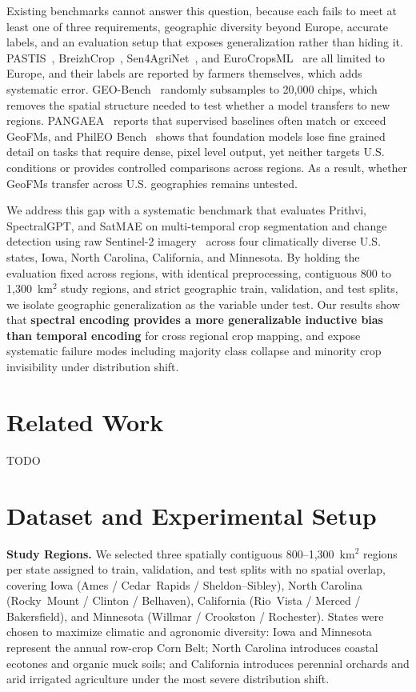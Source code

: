 \documentclass[sigconf]{acmart}
\begin{document}
Existing benchmarks cannot answer this question, because each fails to meet at least one of three requirements, geographic diversity beyond Europe, accurate labels, and an evaluation setup that exposes generalization rather than hiding it. PASTIS~\cite{garnot2021panoptic}, BreizhCrop~\cite{russwurm2019breizhcrops}, Sen4AgriNet~\cite{sykas2021sen4agrinet}, and EuroCropsML~\cite{reuss2025eurocropsml} are all limited to Europe, and their labels are reported by farmers themselves, which adds systematic error. GEO-Bench~\cite{lacoste2023geobench} randomly subsamples to 20{,}000 chips, which removes the spatial structure needed to test whether a model transfers to new regions. PANGAEA~\cite{marsocci2024pangaea} reports that supervised baselines often match or exceed GeoFMs, and PhilEO Bench~\cite{fibaek2024phileo} shows that foundation models lose fine grained detail on tasks that require dense, pixel level output, yet neither targets U.S. conditions or provides controlled comparisons across regions. As a result, whether GeoFMs transfer across U.S. geographies remains untested.

We address this gap with a systematic benchmark that evaluates Prithvi, SpectralGPT, and SatMAE on multi-temporal crop segmentation and change detection using raw Sentinel-2 imagery~\cite{sentinel2_eoportal} across four climatically diverse U.S. states, Iowa, North Carolina, California, and Minnesota. By holding the evaluation fixed across regions, with identical preprocessing, contiguous 800 to 1{,}300~km$^{2}$ study regions, and strict geographic train, validation, and test splits, we isolate geographic generalization as the variable under test. Our results show that \textbf{spectral encoding provides a more generalizable inductive bias than temporal encoding} for cross regional crop mapping, and expose systematic failure modes including majority class collapse and minority crop invisibility under distribution shift.


\section{Related Work}

TODO


\section{Dataset and Experimental Setup}
\textbf{Study Regions.}
We selected three spatially contiguous 800--1{,}300~km$^{2}$
regions per state assigned to train, validation, and test
splits with no spatial overlap, covering Iowa (Ames /
Cedar~Rapids / Sheldon--Sibley), North Carolina
(Rocky~Mount / Clinton / Belhaven), California
(Rio~Vista / Merced / Bakersfield), and Minnesota
(Willmar / Crookston / Rochester). States were chosen to
maximize climatic and agronomic diversity: Iowa and Minnesota
represent the annual row-crop Corn Belt; North Carolina
introduces coastal ecotones and organic muck soils; and
California introduces perennial orchards and arid irrigated
agriculture under the most severe distribution shift.
\end{document}
